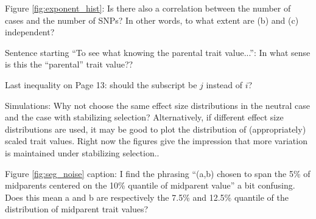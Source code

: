 \reply{
}

\begin{point}{}
    Figure \ref{fig:exponent_hist}: Is there also a correlation between the number of cases and the number of SNPs? In other words, to what extent are (b) and (c) independent?
\end{point}


\begin{point}{\revref}
    Sentence starting ``To see what knowing the parental trait value...'': In what sense is this the ``parental'' trait value??
\end{point}

\reply{
}

\begin{point}{\revref}
    Last inequality on Page 13: should the subscript be $j$ instead of $i$?
\end{point}


\begin{point}{}
    Simulations: Why not choose the same effect size distributions in the neutral case and the case with stabilizing selection? Alternatively, if different effect size distributions are used, it may be good to plot the distribution of (appropriately) scaled trait values. Right now the figures give the impression that more variation is maintained under stabilizing selection..
\end{point}


\begin{point}{}
    Figure \ref{fig:seg_noise} caption: I find the phrasing ``(a,b) chosen to span the 5\% of midparents centered on the 10\% quantile of midparent value'' a bit confusing. Does this mean a and b are respectively the 7.5\% and 12.5\% quantile of the distribution of midparent trait values?
\end{point}


